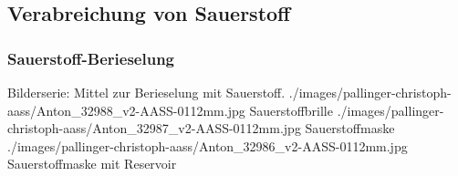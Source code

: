 \documentclass[
ngerman,
paper=a4,
asymmetric,
fontsize=8pt,
draft=false,
numbers=noenddot,
bibtotocnumbered,
footnotes=multiple,
toc=flat,
]{scrbook}
\begin{document}


\subsection{Verabreichung von Sauerstoff}


\subsubsection{Sauerstoff-Berieselung}
\label{topic:berieselung}
\label{topic:berieselungsbrille}
\label{topic:berieselungsmaske}



% 
% 
% 

\begin{PictureSeriesWide}{}
{Bilderserie: Mittel zur Berieselung mit Sauerstoff. }
{./images/pallinger-christoph-aass/Anton_32988_v2-AASS-0112mm.jpg}
{Sauerstoffbrille}
{./images/pallinger-christoph-aass/Anton_32987_v2-AASS-0112mm.jpg}
{Sauerstoffmaske}
{./images/pallinger-christoph-aass/Anton_32986_v2-AASS-0112mm.jpg}
{Sauerstoffmaske mit Reservoir}
{}
{}
\end{PictureSeriesWide}
\end{document}

